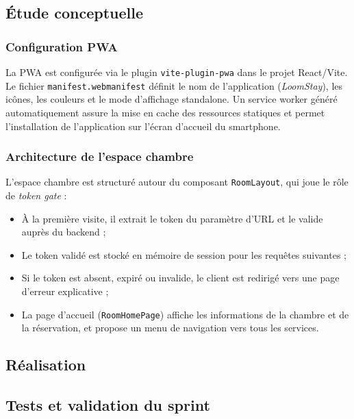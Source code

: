 \subsection{Étude conceptuelle}

\subsubsection{Configuration PWA}

La PWA est configurée via le plugin \texttt{vite-plugin-pwa} dans le projet React/Vite. Le fichier \texttt{manifest.webmanifest} définit le nom de l'application (\textit{LoomStay}), les icônes, les couleurs et le mode d'affichage standalone. Un service worker généré automatiquement assure la mise en cache des ressources statiques et permet l'installation de l'application sur l'écran d'accueil du smartphone.

\subsubsection{Architecture de l'espace chambre}

L'espace chambre est structuré autour du composant \texttt{RoomLayout}, qui joue le rôle de \textit{token gate} :
\begin{itemize}
  \item À la première visite, il extrait le token du paramètre d'URL et le valide auprès du backend ;
  \item Le token validé est stocké en mémoire de session pour les requêtes suivantes ;
  \item Si le token est absent, expiré ou invalide, le client est redirigé vers une page d'erreur explicative ;
  \item La page d'accueil (\texttt{RoomHomePage}) affiche les informations de la chambre et de la réservation, et propose un menu de navigation vers tous les services.
\end{itemize}

\subsection{Réalisation}


\subsection{Tests et validation du sprint}

